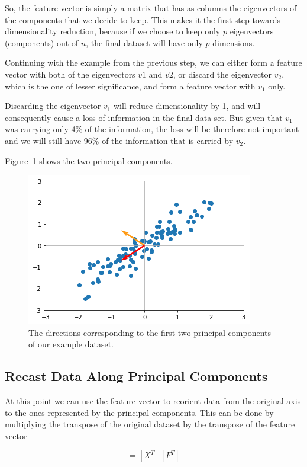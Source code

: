 So, the feature vector is simply a matrix that has as columns the eigenvectors of the components that we decide to keep. This makes it the first step towards dimensionality reduction, because if we choose to keep only $p$ eigenvectors (components) out of $n$, the final dataset will have only $p$ dimensions.

Continuing with the example from the previous step, we can either form a feature vector with both of the eigenvectors $v1$ and $v2$, or discard the eigenvector $v_2$, which is the one of lesser significance, and form a feature vector with $v_1$ only.

Discarding the eigenvector $v_1$ will reduce dimensionality by 1, and will consequently cause a loss of information in the final data set. But given that $v_1$ was carrying only 4\% of the information, the loss will be therefore not important and we will still have 96\% of the information that is carried by $v_2$.

Figure~\ref{fig:pca_result} shows the two principal components.

\begin{figure}[htb]
	\centering
	\includegraphics[width=0.7\linewidth]{figures/pca_result}
	\caption{The directions corresponding to the first two principal 
		components of our example dataset.}
	\label{fig:pca_result}
\end{figure}

\subsection{Recast Data Along Principal Components}
At this point we can use the feature vector to reorient data from the original axis to the ones represented by the principal components. 
This can be done by multiplying the transpose of the original dataset by the transpose of the feature vector

\begin{equation}
[Y] = [X^T][F^T]
\end{equation}

